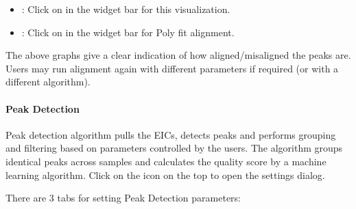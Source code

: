 \documentclass[letterpaper,10pt,english,openany,oneside]{sphinxmanual}
\begin{document}
\begin{itemize}
\item {} 
: Click on  in the widget bar for this visualization.

\end{itemize}

\begin{itemize}
\item {} 
: Click on  in the widget bar for Poly fit alignment.

\end{itemize}


The above graphs give a clear indication of how aligned/misaligned the peaks are. Users may run alignment again with different parameters if required (or with a different algorithm).


\paragraph{Peak Detection}
\label{\detokenize{IntroductiontoElMAVENUI:peak-detection}}
Peak detection algorithm pulls the EICs, detects peaks and performs grouping and filtering based on parameters controlled by the users. The algorithm groups identical peaks across samples and calculates the quality score by a machine learning algorithm. Click on the  icon  on the top to open the settings dialog.

There are 3 tabs for setting Peak Detection parameters:


\end{document}
